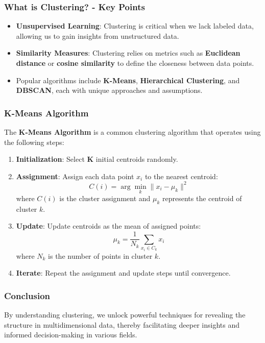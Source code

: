 \documentclass[aspectratio=169]{beamer}
\begin{document}
\begin{frame}[fragile]
    \frametitle{What is Clustering? - Key Points}
    \begin{itemize}
        \item \textbf{Unsupervised Learning}: Clustering is critical when we lack labeled data, allowing us to gain insights from unstructured data.
        \item \textbf{Similarity Measures}: Clustering relies on metrics such as \textbf{Euclidean distance} or \textbf{cosine similarity} to define the closeness between data points.
        \item Popular algorithms include \textbf{K-Means}, \textbf{Hierarchical Clustering}, and \textbf{DBSCAN}, each with unique approaches and assumptions.
    \end{itemize}
\end{frame}

\begin{frame}[fragile]
    \frametitle{K-Means Algorithm}
    The \textbf{K-Means Algorithm} is a common clustering algorithm that operates using the following steps:
    \begin{enumerate}
        \item \textbf{Initialization}: Select \textbf{K} initial centroids randomly.
        \item \textbf{Assignment}: Assign each data point \(x_i\) to the nearest centroid:
        \begin{equation}
        C(i) = \arg \min_{k} \| x_i - \mu_k \|^2
        \end{equation}
        where \(C(i)\) is the cluster assignment and \(\mu_k\) represents the centroid of cluster \(k\).
        \item \textbf{Update}: Update centroids as the mean of assigned points:
        \begin{equation}
        \mu_k = \frac{1}{N_k} \sum_{x_i \in C_k} x_i
        \end{equation}
        where \(N_k\) is the number of points in cluster \(k\).
        \item \textbf{Iterate}: Repeat the assignment and update steps until convergence.
    \end{enumerate}
\end{frame}

\begin{frame}[fragile]
    \frametitle{Conclusion}
    By understanding clustering, we unlock powerful techniques for revealing the structure in multidimensional data, thereby facilitating deeper insights and informed decision-making in various fields.
\end{frame}
\end{document}
